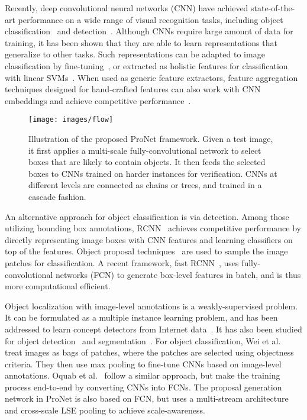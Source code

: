 \documentclass[10pt,twocolumn,letterpaper]{article}
\begin{document}
Recently, deep convolutional neural networks (CNN) have achieved state-of-the-art performance on a wide range of visual recognition tasks, including object classification~\cite{NIPS2012_4824,Simonyan14c,DBLP:journals/corr/SermanetEZMFL13} and detection~\cite{DBLP:journals/corr/GirshickDDM13,DBLP:journals/corr/Girshick15}. Although CNNs require large amount of data for training, it has been shown that they are able to learn representations that generalize to other tasks. Such representations can be adapted to image classification by fine-tuning~\cite{DBLP:conf/cvpr/OquabBLS14}, or extracted as holistic features for classification with linear SVMs~\cite{DBLP:journals/corr/ChatfieldSVZ14}. When used as generic feature extractors, feature aggregation techniques designed for hand-crafted features can also work with CNN embeddings and achieve competitive performance~\cite{DBLP:journals/corr/GongWGL14}.

\begin{figure*}[!ht]
  \centering
    \texttt{[image: images/flow]}
  \caption{Illustration of the proposed ProNet framework. Given a test image, it first applies a multi-scale fully-convolutional network to select boxes that are likely to contain objects. It then feeds the selected boxes to CNNs trained on harder instances for verification. CNNs at different levels are connected as chains or trees, and trained in a cascade fashion.}
  \label{fig:flow}
\end{figure*}

An alternative approach for object classification is via detection. Among those utilizing bounding box annotations, RCNN~\cite{DBLP:journals/corr/GirshickDDM13} achieves competitive performance by directly representing image boxes with CNN features and learning classifiers on top of the features. Object proposal techniques~\cite{DBLP:journals/ijcv/UijlingsSGS13,DBLP:conf/eccv/ZitnickD14} are used to sample the image patches for classification. A recent framework, fast RCNN~\cite{DBLP:journals/corr/Girshick15}, uses fully-convolutional networks (FCN) to generate box-level features in batch, and is thus more computational efficient.

Object localization with image-level annotations is a weakly-supervised problem. It can be formulated as a multiple instance learning problem, and has been addressed to learn concept detectors from Internet data~\cite{chen2013neil,DBLP:conf/cvpr/DivvalaFG14,wu2015webconcept}. It has also been studied for object detection~\cite{Bilen_2015_CVPR,DBLP:conf/cvpr/CinbisVS14,DBLP:conf/icml/SongGJMHD14,DBLP:conf/eccv/RussakovskyLYF12,zhou2015cnnlocalization} and segmentation~\cite{DBLP:journals/corr/DaiH015,DBLP:journals/corr/PapandreouCMY15,pinheiro:2015a}. For object classification, Wei et al.~\cite{DBLP:journals/corr/WeiXHNDZY14} treat images as bags of patches, where the patches are selected using objectness criteria. They then use max pooling to fine-tune CNNs based on image-level annotations. Oquab et al.~\cite{Oquab_2015_CVPR} follow a similar approach, but make the training process end-to-end by converting CNNs into FCNs. The proposal generation network in ProNet is also based on FCN, but uses a multi-stream architecture and cross-scale LSE pooling to achieve scale-awareness.
\end{document}
